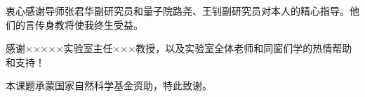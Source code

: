 
\begin{acknowledgements}
  衷心感谢导师张君华副研究员和量子院路尧、王钊副研究员对本人的精心指导。他们的言传身教将使我终生受益。


  感谢×××××实验室主任×××教授，以及实验室全体老师和同窗们学的热情帮助和支持！

  本课题承蒙国家自然科学基金资助，特此致谢。
\end{acknowledgements}
